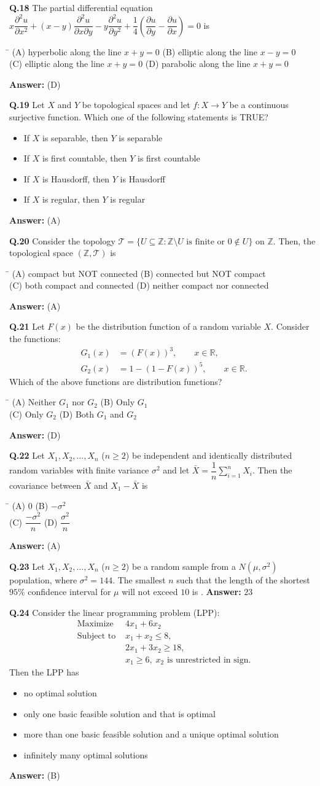 \documentclass[11pt,a4paper]{article}
\newcommand{\optsfourA}[4]{%
  \begin{tabbing}
    \hspace{0.48\linewidth}\=\kill
    (A) #1 \> (B) #2 \\[2pt]
    (C) #3 \> (D) #4
  \end{tabbing}%
}
\newcommand{\optslistA}[4]{%
  \begin{itemize}
    \setlength{\itemsep}{2pt}\setlength{\parskip}{0pt}
    \item[(A)] #1
    \item[(B)] #2
    \item[(C)] #3
    \item[(D)] #4
  \end{itemize}%
}
\newcommand{\ans}[1]{\textbf{Answer:} #1\par\medskip}
\begin{document}
\textbf{Q.18} The partial differential equation $x\dfrac{\partial^2 u}{\partial x^2} + (x - y)\dfrac{\partial^2 u}{\partial x \partial y} - y\dfrac{\partial^2 u}{\partial y^2} + \dfrac{1}{4}\!\left(\dfrac{\partial u}{\partial y} - \dfrac{\partial u}{\partial x}\right) = 0$ is
\optsfourA{hyperbolic along the line $x + y = 0$}{elliptic along the line $x - y = 0$}{elliptic along the line $x + y = 0$}{parabolic along the line $x + y = 0$}
\ans{(D)}

\textbf{Q.19} Let $X$ and $Y$ be topological spaces and let $f : X \to Y$ be a continuous surjective function. Which one of the following statements is TRUE?
\optslistA{If $X$ is separable, then $Y$ is separable}{If $X$ is first countable, then $Y$ is first countable}{If $X$ is Hausdorff, then $Y$ is Hausdorff}{If $X$ is regular, then $Y$ is regular}
\ans{(A)}

\textbf{Q.20} Consider the topology $\mathcal{T} = \{U \subseteq \mathbb{Z} : \mathbb{Z} \setminus U \text{ is finite or } 0 \notin U\}$ on $\mathbb{Z}$. Then, the topological space $(\mathbb{Z}, \mathcal{T})$ is
\optsfourA{compact but NOT connected}{connected but NOT compact}{both compact and connected}{neither compact nor connected}
\ans{(A)}

\textbf{Q.21} Let $F(x)$ be the distribution function of a random variable $X$. Consider the functions:
\begin{align*}
  G_1(x) &= (F(x))^3, \qquad x \in \mathbb{R}, \\
  G_2(x) &= 1 - (1 - F(x))^5, \qquad x \in \mathbb{R}.
\end{align*}
Which of the above functions are distribution functions?
\optsfourA{Neither $G_1$ nor $G_2$}{Only $G_1$}{Only $G_2$}{Both $G_1$ and $G_2$}
\ans{(D)}

\textbf{Q.22} Let $X_1, X_2, \dots, X_n$ ($n \ge 2$) be independent and identically distributed random variables with finite variance $\sigma^2$ and let $\bar{X} = \dfrac{1}{n} \displaystyle\sum_{i=1}^{n} X_i$. Then the covariance between $\bar{X}$ and $X_1 - \bar{X}$ is
\optsfourA{$0$}{$-\sigma^2$}{$\dfrac{-\sigma^2}{n}$}{$\dfrac{\sigma^2}{n}$}
\ans{(A)}

\textbf{Q.23} Let $X_1, X_2, \dots, X_n$ ($n \ge 2$) be a random sample from a $N(\mu, \sigma^2)$ population, where $\sigma^2 = 144$. The smallest $n$ such that the length of the shortest $95\%$ confidence interval for $\mu$ will not exceed $10$ is \underline{\hspace{2cm}}.
\ans{$23$}

\textbf{Q.24} Consider the linear programming problem (LPP):
\begin{align*}
  \text{Maximize } & 4x_1 + 6x_2 \\
  \text{Subject to } & x_1 + x_2 \le 8, \\
                     & 2x_1 + 3x_2 \ge 18, \\
                     & x_1 \ge 6,\; x_2 \text{ is unrestricted in sign.}
\end{align*}
Then the LPP has
\optslistA{no optimal solution}{only one basic feasible solution and that is optimal}{more than one basic feasible solution and a unique optimal solution}{infinitely many optimal solutions}
\ans{(B)}
\end{document}
